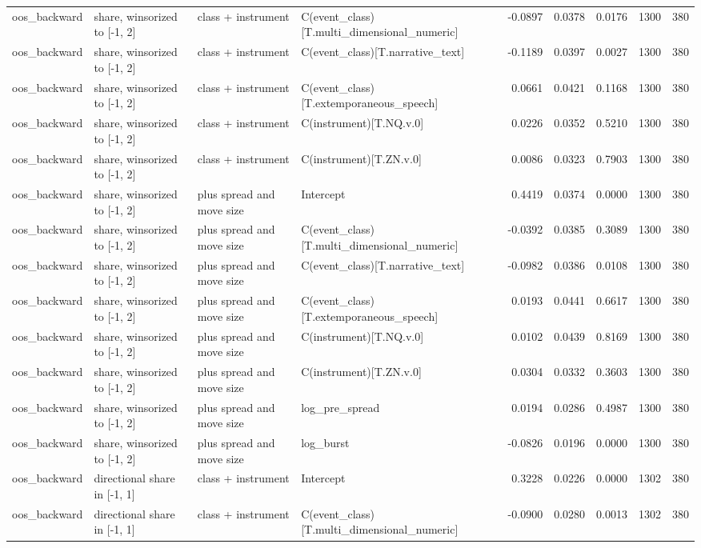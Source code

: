 \begin{tabular}{llllrrrrr}
oos_backward & share, winsorized to [-1, 2] & class + instrument & C(event_class)[T.multi_dimensional_numeric] & -0.0897 & 0.0378 & 0.0176 & 1300 & 380 \\
oos_backward & share, winsorized to [-1, 2] & class + instrument & C(event_class)[T.narrative_text] & -0.1189 & 0.0397 & 0.0027 & 1300 & 380 \\
oos_backward & share, winsorized to [-1, 2] & class + instrument & C(event_class)[T.extemporaneous_speech] & 0.0661 & 0.0421 & 0.1168 & 1300 & 380 \\
oos_backward & share, winsorized to [-1, 2] & class + instrument & C(instrument)[T.NQ.v.0] & 0.0226 & 0.0352 & 0.5210 & 1300 & 380 \\
oos_backward & share, winsorized to [-1, 2] & class + instrument & C(instrument)[T.ZN.v.0] & 0.0086 & 0.0323 & 0.7903 & 1300 & 380 \\
oos_backward & share, winsorized to [-1, 2] & plus spread and move size & Intercept & 0.4419 & 0.0374 & 0.0000 & 1300 & 380 \\
oos_backward & share, winsorized to [-1, 2] & plus spread and move size & C(event_class)[T.multi_dimensional_numeric] & -0.0392 & 0.0385 & 0.3089 & 1300 & 380 \\
oos_backward & share, winsorized to [-1, 2] & plus spread and move size & C(event_class)[T.narrative_text] & -0.0982 & 0.0386 & 0.0108 & 1300 & 380 \\
oos_backward & share, winsorized to [-1, 2] & plus spread and move size & C(event_class)[T.extemporaneous_speech] & 0.0193 & 0.0441 & 0.6617 & 1300 & 380 \\
oos_backward & share, winsorized to [-1, 2] & plus spread and move size & C(instrument)[T.NQ.v.0] & 0.0102 & 0.0439 & 0.8169 & 1300 & 380 \\
oos_backward & share, winsorized to [-1, 2] & plus spread and move size & C(instrument)[T.ZN.v.0] & 0.0304 & 0.0332 & 0.3603 & 1300 & 380 \\
oos_backward & share, winsorized to [-1, 2] & plus spread and move size & log_pre_spread & 0.0194 & 0.0286 & 0.4987 & 1300 & 380 \\
oos_backward & share, winsorized to [-1, 2] & plus spread and move size & log_burst & -0.0826 & 0.0196 & 0.0000 & 1300 & 380 \\
oos_backward & directional share in [-1, 1] & class + instrument & Intercept & 0.3228 & 0.0226 & 0.0000 & 1302 & 380 \\
oos_backward & directional share in [-1, 1] & class + instrument & C(event_class)[T.multi_dimensional_numeric] & -0.0900 & 0.0280 & 0.0013 & 1302 & 380 \\

\end{tabular}
